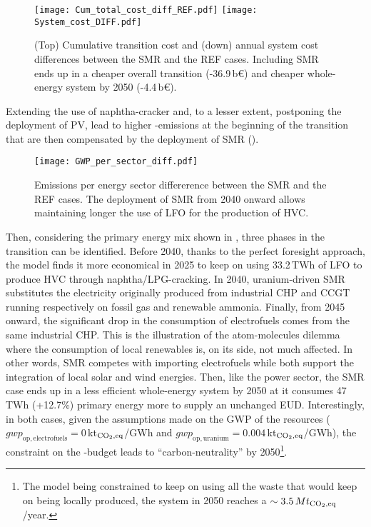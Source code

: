 \begin{figure}[htbp!]
\centering
\texttt{[image: Cum\_total\_cost\_diff\_REF.pdf]}
\texttt{[image: System\_cost\_DIFF.pdf]}
\caption{(Top) Cumulative transition cost and (down) annual system cost differences between the SMR and the REF cases. Including \gls{SMR} ends up in a cheaper overall transition (-36.9\,b€) and cheaper whole-energy system by 2050 (-4.4\,b€).}
\label{fig:results_deter_overall_emissions_sector}
\end{figure}

Extending the use of naphtha-cracker and, to a lesser extent, postponing the deployment of PV, lead to higher -emissions at the beginning of the transition that are then compensated by the deployment of \gls{SMR} (). 

\begin{figure}[htbp!]
\centering
\texttt{[image: GWP\_per\_sector\_diff.pdf]}
\caption{Emissions per energy sector differerence between the SMR and the REF cases. The deployment of \gls{SMR} from 2040 onward allows maintaining longer the use of \acrfull{LFO} for the production of \acrfull{HVC}.}
\label{fig:GWP_per_sector_diff}
\end{figure}

Then, considering the primary energy mix shown in , three phases in the transition can be identified. Before 2040, thanks to the perfect foresight approach, the model finds it more economical in 2025 to keep on using 33.2\,TWh of \gls{LFO} to produce \gls{HVC} through naphtha/LPG-cracking. In 2040, uranium-driven \gls{SMR} substitutes the electricity originally produced from industrial \gls{CHP} and \gls{CCGT} running respectively on fossil gas and renewable ammonia. Finally, from 2045 onward, the significant drop in the consumption of electrofuels comes from the same industrial \gls{CHP}. This is the illustration of the atom-molecules dilemma where the consumption of local renewables is, on its side, not much affected. In other words, \gls{SMR} competes with importing electrofuels while both support the integration of local solar and wind energies. Then, like the power sector, the SMR case ends up in a less efficient whole-energy system by 2050 at it consumes 47\,TWh (+12.7\%) primary energy more to supply an unchanged \gls{EUD}. Interestingly, in both cases, given the assumptions made on the \gls{GWP} of the resources (\ie $\mathit{gwp}_{\mathrm{op,electrofuels}}=0$\,kt$_{\ce{CO2},\text{eq}}$/GWh and $\mathit{gwp}_{\mathrm{op,uranium}}=0.004$\,kt$_{\ce{CO2},\text{eq}}$/GWh), the constraint on the -budget leads to ``carbon-neutrality'' by 2050\footnote{The model being constrained to keep on using all the waste that would keep on being locally produced, the system in 2050 reaches a $\sim 3.5\,Mt_{\ce{CO2},\text{eq}}$/year.}.

